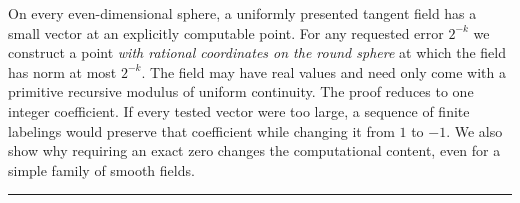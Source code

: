\documentclass[11pt,letterpaper]{article}
\theoremstyle{definition}\newtheorem{definition}[theorem]{Definition}
\begin{document}
\thispagestyle{plain}
\vspace{3pt}
\vspace{12pt}
\noindent
On every even-dimensional sphere, a uniformly presented tangent field has a
small vector at an explicitly computable point. For any requested error
$2^{-k}$ we construct a point \emph{with rational coordinates on the
round sphere} at which the field has norm at most $2^{-k}$. The field
may have real values and need only come with a primitive recursive
modulus of uniform continuity. The proof reduces to one integer
coefficient. If every tested vector were too large, a sequence of finite
labelings would preserve that coefficient while changing it from $1$ to
$-1$. We also show why requiring an exact zero changes the
computational content, even for a simple family of smooth fields.
\par\vspace{6pt}\hrule\vspace{4pt}








\end{document}
